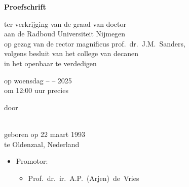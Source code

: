 \begin{titlepage}
	\begin{center}
		\vspace*{3.5cm}
		
		\huge{\bfseries\mytitle}
		
		\vspace*{15pt}
		
		
		\vspace*{5pt}
		
		\normalsize
		
		\vspace{2.0cm}
		
		\textbf{Proefschrift}
		
		\vspace{0.5cm}
		
		ter verkrijging van de graad van doctor\\
		aan de Radboud Universiteit Nijmegen\\
		op gezag van de rector magnificus
		prof.~dr.~J.M.\ Sanders,\\
		volgens besluit van het college van decanen\\
		in het openbaar te verdedigen
		
		\vspace{0.5cm}
		
		op woensdag -- -- 2025\\
		\vspace{0.2cm}
		om 12:00 uur precies
		
		\vspace{0.5cm}
		
		door
		
		\vspace{0.5cm}
		
		\textbf{\myauthor}\\
		
		geboren op 22 maart 1993\\
		te Oldenzaal, Nederland
	\end{center}
\end{titlepage}

\newpage%

\thispagestyle{empty}

\begin{itemize}
	\item[] Promotor:
	\begin{itemize}
		\item[] Prof.\ dr.\ ir.\ A.P.\ (Arjen)\ de\ Vries
	\end{itemize}
\end{itemize}

